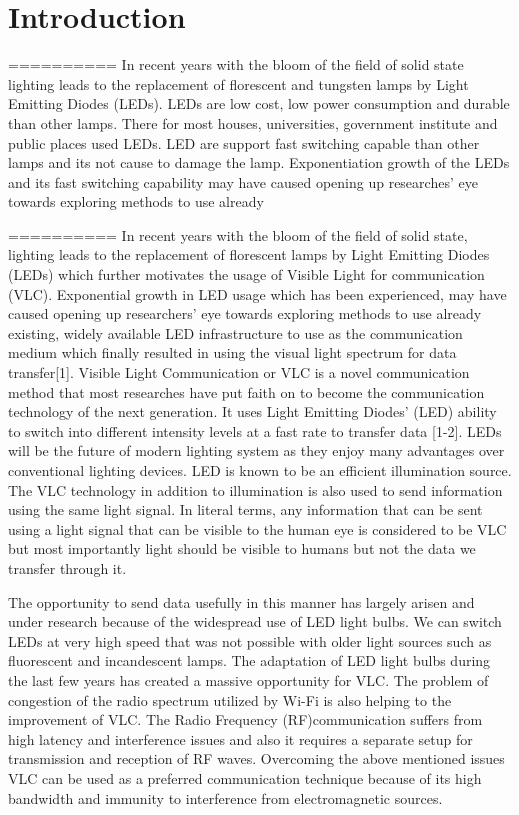 \chapter{Introduction}

==========
In recent years with the bloom of the field of solid state lighting leads to the replacement of florescent and tungsten lamps by Light Emitting Diodes (LEDs). LEDs are low cost, low power consumption and durable than other lamps. There for most houses, universities, government institute and public places used LEDs. LED are support fast switching capable than other lamps and its not cause to damage the lamp. Exponentiation growth of the LEDs and its fast switching capability may have caused opening up researches' eye towards exploring methods to use already       

==========
In recent years with the bloom of the field of solid state, lighting leads to the replacement of florescent lamps by Light Emitting Diodes (LEDs) which further motivates the usage of Visible Light for communication (VLC). Exponential growth in LED usage which has been experienced, may have caused opening up researchers' eye towards exploring methods to use already existing, widely available LED infrastructure to use as the communication medium which finally resulted in using the visual light spectrum for data transfer[1]. Visible Light Communication or VLC is a novel communication method that most researches have put faith on to become the communication technology of the next generation. It uses Light Emitting Diodes' (LED) ability to switch into different intensity levels at a fast rate to transfer data [1-2]. LEDs will be the future of modern lighting system as they enjoy many advantages over conventional lighting devices. LED is known to be an efficient illumination source. The VLC technology in addition to illumination is also used to send information using the same light signal. In literal terms, any information that can be sent using a light signal that can be visible to the human eye is considered to be VLC but most importantly light should be visible to humans but not the data we transfer through it.

The opportunity to send data usefully in this manner has largely arisen and under research because of the widespread use of LED light bulbs. We can switch LEDs at very high speed that was not possible with older light sources such as fluorescent and incandescent lamps. The adaptation of LED light bulbs during the last few years has created a massive opportunity for VLC. The problem of congestion of the radio spectrum utilized by Wi-Fi is also helping to the improvement of VLC. The Radio Frequency (RF)communication suffers from high latency and interference issues and also it requires a separate setup for transmission and reception of RF waves. Overcoming the above mentioned issues VLC can be used as a preferred communication technique because of its high bandwidth and immunity to interference from electromagnetic sources.

